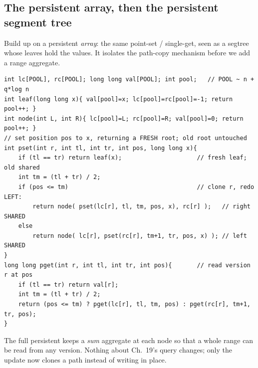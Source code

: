 \subsection{The persistent array, then the persistent segment tree}

Build up on a persistent \emph{array}: the same point-set / single-get, seen as a segtree whose leaves hold the values.  It isolates the path-copy mechanism before we add a range aggregate.

\begin{lstlisting}[caption={persistent array as a path-copying tree: set returns a new root, get reads any version -- O(log n) nodes per set}, label={lst:c19-parray}]
int lc[POOL], rc[POOL]; long long val[POOL]; int pool;   // POOL ~ n + q*log n
int leaf(long long x){ val[pool]=x; lc[pool]=rc[pool]=-1; return pool++; }
int node(int L, int R){ lc[pool]=L; rc[pool]=R; val[pool]=0; return pool++; }
// set position pos to x, returning a FRESH root; old root untouched
int pset(int r, int tl, int tr, int pos, long long x){
    if (tl == tr) return leaf(x);                     // fresh leaf; old shared
    int tm = (tl + tr) / 2;
    if (pos <= tm)                                    // clone r, redo LEFT:
        return node( pset(lc[r], tl, tm, pos, x), rc[r] );   // right SHARED
    else
        return node( lc[r], pset(rc[r], tm+1, tr, pos, x) ); // left SHARED
}
long long pget(int r, int tl, int tr, int pos){       // read version r at pos
    if (tl == tr) return val[r];
    int tm = (tl + tr) / 2;
    return (pos <= tm) ? pget(lc[r], tl, tm, pos) : pget(rc[r], tm+1, tr, pos);
}
\end{lstlisting}

The full persistent  keeps a \emph{sum} aggregate at each node so that a whole range can be read from any version.  Nothing about Ch.~19's query changes; only the update now clones a path instead of writing in place.

